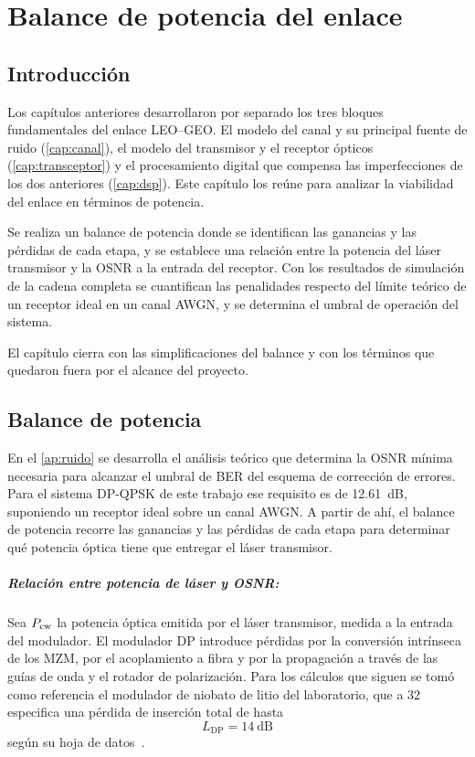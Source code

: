 \chapter{Balance de potencia del enlace}
\label{cap:enlace}

\section{Introducci\'on}
\label{sec:enl-intro}

Los cap\'itulos anteriores desarrollaron por separado los tres bloques
fundamentales del enlace LEO--GEO. El modelo del canal y su principal fuente de
ruido (\cref{cap:canal}), el modelo del transmisor y el receptor \'opticos
(\cref{cap:transceptor}) y el procesamiento digital que compensa las
imperfecciones de los dos anteriores (\cref{cap:dsp}). Este cap\'itulo los
re\'une para analizar la viabilidad del enlace en t\'erminos de potencia.

Se realiza un balance de potencia donde se identifican las ganancias y las
p\'erdidas de cada etapa, y se establece una relaci\'on entre la potencia del
l\'aser transmisor y la OSNR a la entrada del receptor. Con los resultados de
simulaci\'on de la cadena completa se cuantifican las penalidades respecto del
l\'imite te\'orico de un receptor ideal en un canal AWGN, y se determina el
umbral de operaci\'on del sistema.

El cap\'itulo cierra con las simplificaciones del balance y con los t\'erminos
que quedaron fuera por el alcance del proyecto.
\section{Balance de potencia}
\label{sec:enl-linkbudget}

En el \cref{ap:ruido} se desarrolla el an\'alisis te\'orico que determina la
OSNR m\'inima necesaria para alcanzar el umbral de BER del esquema de
correcci\'on de errores. Para el sistema DP-QPSK de este trabajo ese requisito
es de \SI{12.61}{\dB}, suponiendo un receptor ideal sobre un canal AWGN. A
partir de ah\'i, el balance de potencia recorre las ganancias y las p\'erdidas
de cada etapa para determinar qu\'e potencia \'optica tiene que entregar el
l\'aser transmisor.

\paragraph{Relaci\'on entre potencia de l\'aser y OSNR:}
Sea $P_{\mathrm{cw}}$ la potencia \'optica emitida por el l\'aser transmisor, medida a la
entrada del modulador. El modulador DP introduce p\'erdidas por la conversi\'on
intr\'inseca de los MZM, por el acoplamiento a fibra y por la propagaci\'on a
trav\'es de las gu\'ias de onda y el rotador de polarizaci\'on. Para los
c\'alculos que siguen se tom\'o como referencia el modulador de niobato de
litio del laboratorio, que a \SI{32}{\giga\baud} especifica una p\'erdida de
inserci\'on total de hasta
\begin{equation}
  L_{\mathrm{DP}} = \SI{14}{\dB}
  \label{eq:liqm}
\end{equation}
seg\'un su hoja de datos~\cite{fujitsu_ftm7977}.

